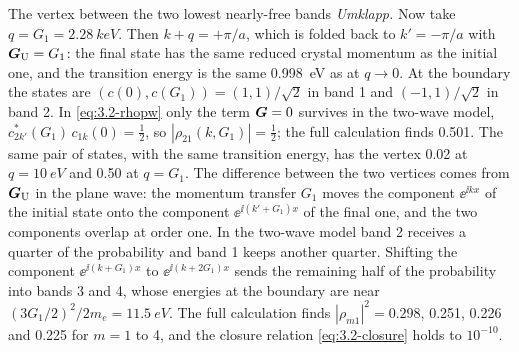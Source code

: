 \begin{workedexample}{The vertex between the two lowest nearly-free bands}
\emph{Umklapp.} Now take $q = G_1 = \SI{2.28}{keV}$. Then $k + q = +\pi/a$, which is folded back to $k' = -\pi/a$ with $\bm{G}_{\mathrm{U}} = G_1$: the final state has the same reduced crystal momentum as the initial one, and the transition energy is the same \SI{0.998}{eV} as at $q \to 0$. At the boundary the states are $(c(0), c(G_1)) = (1, 1)/\sqrt2$ in band 1 and $(-1, 1)/\sqrt2$ in band 2. In \cref{eq:3.2-rhopw} only the term $\bm{G} = 0$ survives in the two-wave model, $c^*_{2k'}(G_1)\,c_{1k}(0) = \tfrac12$, so $|\rho_{21}(k, G_1)| = \tfrac12$; the full calculation finds 0.501. The same pair of states, with the same transition energy, has the vertex 0.02 at $q = \SI{10}{eV}$ and 0.50 at $q = G_1$. The difference between the two vertices comes from $\bm{G}_{\mathrm{U}}$ in the plane wave: the momentum transfer $G_1$ moves the component $\ee^{\ii kx}$ of the initial state onto the component $\ee^{\ii(k'+G_1)x}$ of the final one, and the two components overlap at order one. In the two-wave model band 2 receives a quarter of the probability and band 1 keeps another quarter. Shifting the component $\ee^{\ii(k+G_1)x}$ to $\ee^{\ii(k+2G_1)x}$ sends the remaining half of the probability into bands 3 and 4, whose energies at the boundary are near $(3G_1/2)^2/2m_e = \SI{11.5}{eV}$. The full calculation finds $|\rho_{m1}|^2 = 0.298$, 0.251, 0.226 and 0.225 for $m = 1$ to 4, and the closure relation \cref{eq:3.2-closure} holds to $10^{-10}$.
\end{workedexample}
